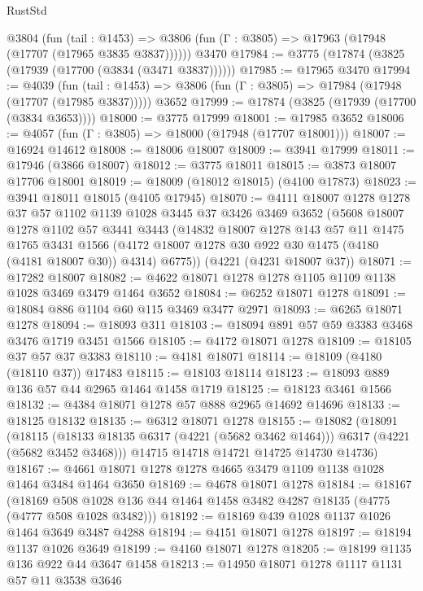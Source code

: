 \begin{lexlean}{RustStd}
\begin{coremodule}
{\begin{coremodule}
{{{{{{{{{{{{{{{{{{{{{{{{{{{{{{{    @3804
      (fun (tail : @1453) =>
      @3806 (fun (Γ : @3805) => @17963 (@17948 (@17707 (@17965 @3835 @3837))))))
    @3470
@17984 := @3775 (@17874 (@3825 (@17939 (@17700 (@3834 (@3471 @3837))))))
@17985 := @17965 @3470
@17994 := @4039
    (fun (tail : @1453) => @3806 (fun (Γ : @3805) => @17984 (@17948 (@17707 (@17985 @3837)))))
    @3652
@17999 := @17874 (@3825 (@17939 (@17700 (@3834 @3653))))
@18000 := @3775 @17999
@18001 := @17985 @3652
@18006 := @4057 (fun (Γ : @3805) => @18000 (@17948 (@17707 @18001)))
@18007 := @16924 @14612
@18008 := @18006 @18007
@18009 := @3941 @17999
@18011 := @17946 (@3866 @18007)
@18012 := @3775 @18011
@18015 := @3873 @18007 @17706 @18001
@18019 := @18009 (@18012 @18015) (@4100 @17873)
@18023 := @3941 @18011 @18015 (@4105 @17945)
@18070 := @4111
    @18007
    @1278
    @1278
    @37
    @57
    @1102
    @1139
    @1028
    @3445
    @37
    @3426
    @3469
    @3652
    (@5608
      @18007
      @1278
      @1102
      @57
      @3441
      @3443
      (@14832
        @18007
        @1278
        @143
        @57
        @11
        @1475
        @1765
        @3431
        @1566
        (@4172 @18007 @1278 @30 @922 @30 @1475 (@4180 (@4181 @18007 @30)) @4314)
        @6775))
    (@4221 (@4231 @18007 @37))
@18071 := @17282 @18007
@18082 := @4622 @18071 @1278 @1278 @1105 @1109 @1138 @1028 @3469 @3479 @1464 @3652
@18084 := @6252 @18071 @1278
@18091 := @18084 @886 @1104 @60 @115 @3469 @3477 @2971
@18093 := @6265 @18071 @1278
@18094 := @18093 @311
@18103 := @18094 @891 @57 @59 @3383 @3468 @3476 @1719 @3451 @1566
@18105 := @4172 @18071 @1278
@18109 := @18105 @37 @57 @37 @3383
@18110 := @4181 @18071
@18114 := @18109 (@4180 (@18110 @37)) @17483
@18115 := @18103 @18114
@18123 := @18093 @889 @136 @57 @44 @2965 @1464 @1458 @1719
@18125 := @18123 @3461 @1566
@18132 := @4384 @18071 @1278 @57 @888 @2965 @14692 @14696
@18133 := @18125 @18132
@18135 := @6312 @18071 @1278
@18155 := @18082
    (@18091
      (@18115 (@18133 @18135 @6317 (@4221 (@5682 @3462 @1464))) @6317 (@4221 (@5682 @3452 @3468)))
      @14715
      @14718
      @14721
      @14725
      @14730
      @14736)
@18167 := @4661 @18071 @1278 @1278 @4665 @3479 @1109 @1138 @1028 @1464 @3484 @1464 @3650
@18169 := @4678 @18071 @1278
@18184 := @18167
    (@18169 @508 @1028 @136 @44 @1464 @1458 @3482 @4287 @18135 (@4775 (@4777 @508 @1028 @3482)))
@18192 := @18169 @439 @1028 @1137 @1026 @1464 @3649 @3487 @4288
@18194 := @4151 @18071 @1278
@18197 := @18194 @1137 @1026 @3649
@18199 := @4160 @18071 @1278
@18205 := @18199 @1135 @136 @922 @44 @3647 @1458
@18213 := @14950 @18071 @1278 @1117 @1131 @57 @11 @3538 @3646
}}}}}}}}}}}}}}}}}}}}}}}}}}}}}}}
\end{coremodule}}
\end{coremodule}
\end{lexlean}
